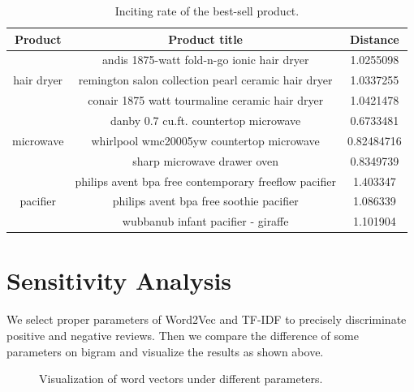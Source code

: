\documentclass[12pt]{article}%
\begin{document}
\begin{table}[H]
	\centering
	\caption{Inciting rate of the best-sell product.}	
	\begin{tabular}{c|cc}
		\toprule[1.5pt]
		\multicolumn{1}{m{2cm}}{\centering Product} &
		\multicolumn{1}{m{9cm}}{\centering Product title} & \multicolumn{1}{m{2cm}}{\centering Distance}\\
		\midrule[1pt]
		&andis 1875-watt fold-n-go ionic hair dryer &1.0255098\\
		hair dryer&remington salon collection pearl ceramic hair dryer     & 1.0337255\\
		&conair 1875 watt tourmaline ceramic hair dryer          &1.0421478\\
		\midrule[1pt]
		&danby 0.7 cu.ft. countertop microwave          & 0.6733481\\
		microwave&whirlpool wmc20005yw  countertop microwave          &0.82484716\\
		&sharp microwave drawer oven        &0.8349739\\
				\midrule[1pt]
		&philips avent bpa free contemporary freeflow pacifier        &1.403347\\
		pacifier&philips avent bpa free soothie pacifier       &1.086339\\
		&wubbanub infant pacifier - giraffe&1.101904\\
		\bottomrule[1.6pt]
	\end{tabular}\label{biasssso}
\end{table}


\section{Sensitivity Analysis}

We select proper parameters of Word2Vec and TF-IDF to precisely discriminate positive and negative reviews. Then we compare the difference of some parameters on bigram and visualize the results as shown above.

\begin{figure}[H]
	\centering

	
		\centering
	\caption{Visualization of word vectors under different parameters.}
	\label{fisg}
\end{figure}
\end{document}
